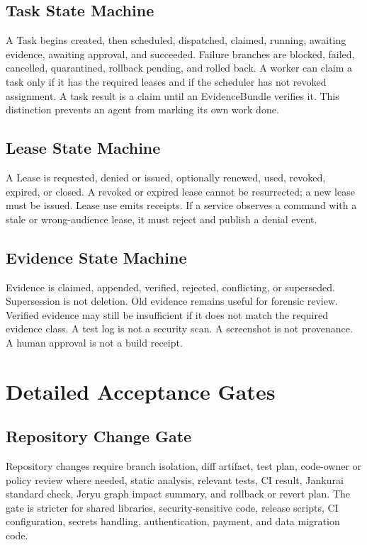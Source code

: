 \documentclass[10pt,journal,onecolumn]{IEEEtran}
\begin{document}
\subsection{Task State Machine}
A Task begins created, then scheduled, dispatched, claimed, running, awaiting evidence, awaiting approval, and succeeded. Failure branches are blocked, failed, cancelled, quarantined, rollback pending, and rolled back. A worker can claim a task only if it has the required leases and if the scheduler has not revoked assignment. A task result is a claim until an EvidenceBundle verifies it. This distinction prevents an agent from marking its own work done.

\subsection{Lease State Machine}
A Lease is requested, denied or issued, optionally renewed, used, revoked, expired, or closed. A revoked or expired lease cannot be resurrected; a new lease must be issued. Lease use emits receipts. If a service observes a command with a stale or wrong-audience lease, it must reject and publish a denial event.

\subsection{Evidence State Machine}
Evidence is claimed, appended, verified, rejected, conflicting, or superseded. Supersession is not deletion. Old evidence remains useful for forensic review. Verified evidence may still be insufficient if it does not match the required evidence class. A test log is not a security scan. A screenshot is not provenance. A human approval is not a build receipt.

\section{Detailed Acceptance Gates}
\subsection{Repository Change Gate}
Repository changes require branch isolation, diff artifact, test plan, code-owner or policy review where needed, static analysis, relevant tests, CI result, Jankurai standard check, Jeryu graph impact summary, and rollback or revert plan. The gate is stricter for shared libraries, security-sensitive code, release scripts, CI configuration, secrets handling, authentication, payment, and data migration code.
\end{document}
